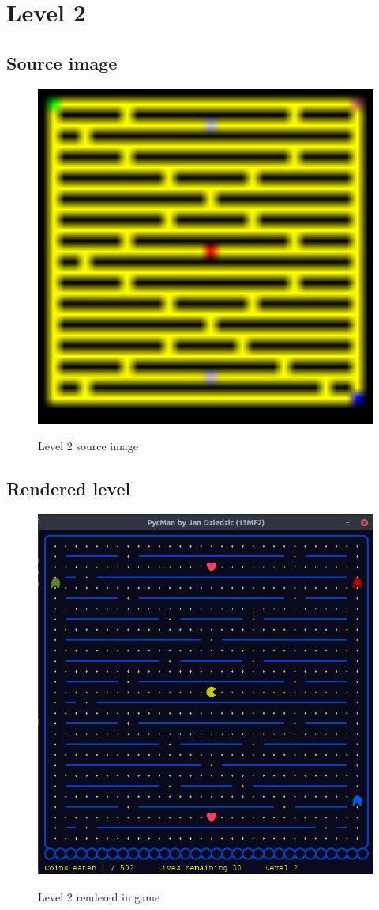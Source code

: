 \documentclass[11pt,a4paper,notitlepage]{report}
\newcommand{\dsubsection}[1]{\FloatBarrier \subsection{#1}}
\newenvironment{img}{
	\begin{center}
		\begin{figure}[H]
			\begin{center}
			
}{
	\end{center}
		\end{figure}
			\end{center}
}
\begin{document}
		\section{Level 2}
			\dsubsection{Source image}
			\begin{img}
				\includegraphics[width=350pt]{images/level2}\\
				\caption{Level 2 source image}
			\end{img}
			\dsubsection{Rendered level}
			\begin{img}
				\includegraphics[width=350pt]{images/level2_r}\\
				\caption{Level 2 rendered in game}
			\end{img}
\end{document}
